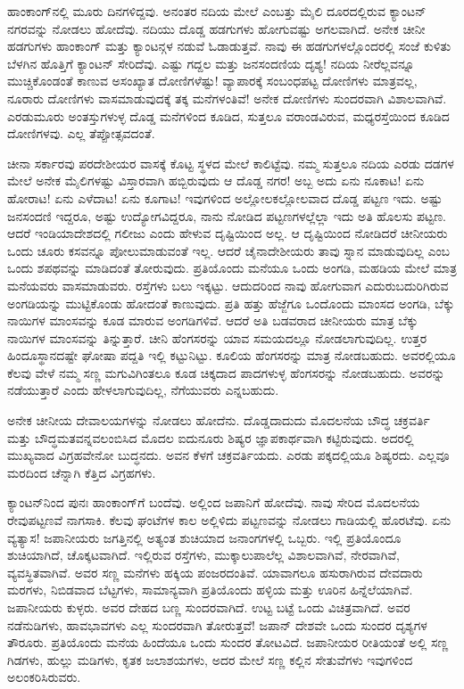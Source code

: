 ಹಾಂಕಾಂಗ್‌ನಲ್ಲಿ ಮೂರು ದಿನಗಳಿದ್ದವು. ಅನಂತರ ನದಿಯ ಮೇಲೆ ಎಂಬತ್ತು ಮೈಲಿ ದೂರದಲ್ಲಿರುವ ಕ್ಯಾಂಟನ್ ನಗರವನ್ನು ನೋಡಲು ಹೋದೆವು. ನದಿಯು ದೊಡ್ಡ ಹಡಗುಗಳು ಹೋಗುವಷ್ಟು ಅಗಲವಾಗಿದೆ. ಅನೇಕ ಚೀನೀ ಹಡಗುಗಳು ಹಾಂಕಾಂಗ್ ಮತ್ತು ಕ್ಯಾಂಟನ್ಗಳ ನಡುವೆ ಓಡಾಡುತ್ತವೆ. ನಾವು ಈ ಹಡಗುಗಳಲ್ಲೊಂದರಲ್ಲಿ ಸಂಜೆ ಕುಳಿತು ಬೆಳಗಿನ ಹೊತ್ತಿಗೆ ಕ್ಯಾಂಟನ್‌ ಸೇರಿದೆವು. ಎಷ್ಟು ಗದ್ದಲ ಮತ್ತು ಜನಸಂದಣಿಯ ದೃಶ್ಯ! ನದಿಯ ನೀರೆಲ್ಲವನ್ನೂ ಮುಚ್ಚಿಕೊಂಡಂತೆ ಕಾಣುವ ಅಸಂಖ್ಯಾತ ದೋಣಿಗಳೆಷ್ಟು! ವ್ಯಾಪಾರಕ್ಕೆ ಸಂಬಂಧಪಟ್ಟ ದೋಣಿಗಳು ಮಾತ್ರವಲ್ಲ, ನೂರಾರು ದೋಣಿಗಳು ವಾಸಮಾಡುವುದಕ್ಕೆ ತಕ್ಕ ಮನೆಗಳಂತಿವೆ! ಅನೇಕ ದೋಣಿಗಳು ಸುಂದರವಾಗಿ ವಿಶಾಲವಾಗಿವೆ. ಎರಡು\enginline{-}ಮೂರು ಅಂತಸ್ತುಗಳುಳ್ಳ ದೊಡ್ಡ ಮನೆಗಳಿಂದ ಕೂಡಿದ, ಸುತ್ತಲೂ ವರಾಂಡವಿರುವ, ಮಧ್ಯರಸ್ತೆಯಿಂದ ಕೂಡಿದ ದೋಣಿಗಳವು. ಎಲ್ಲ ತೆಪ್ಪೋತ್ಸವದಂತೆ.

ಚೀನಾ ಸರ್ಕಾರವು ಪರದೇಶೀಯರ ವಾಸಕ್ಕೆ ಕೊಟ್ಟ ಸ್ಥಳದ ಮೇಲೆ ಕಾಲಿಟ್ಟೆವು. ನಮ್ಮ ಸುತ್ತಲೂ ನದಿಯ ಎರಡು ದಡಗಳ ಮೇಲೆ ಅನೇಕ ಮೈಲಿಗಳಷ್ಟು ವಿಸ್ತಾರವಾಗಿ ಹಬ್ಬಿರುವುದು ಆ ದೊಡ್ಡ ನಗರ! ಅಬ್ಬ ಅದು ಏನು ನೂಕಾಟ! ಏನು ಹೋರಾಟ! ಏನು ಎಳೆದಾಟ! ಏನು ಕೂಗಾಟ! ಇವುಗಳಿಂದ ಅಲ್ಲೋಲಕಲ್ಲೋಲವಾದ ದೊಡ್ಡ ಪಟ್ಟಣ ಇದು. ಅಷ್ಟು ಜನಸಂದಣಿ ಇದ್ದರೂ, ಅಷ್ಟು ಉದ್ಯೋಗವಿದ್ದರೂ, ನಾನು ನೋಡಿದ ಪಟ್ಟಣಗಳಲ್ಲೆಲ್ಲಾ ಇದು ಅತಿ ಹೊಲಸು ಪಟ್ಟಣ. ಆದರೆ ಇಂಡಿಯಾದೇಶದಲ್ಲಿ ಗಲೀಜು ಎಂದು ಹೇಳುವ ದೃಷ್ಟಿಯಿಂದ ಅಲ್ಲ. ಆ ದೃಷ್ಟಿಯಿಂದ ನೋಡಿದರೆ ಚೀನೀಯರು ಒಂದು ಚೂರು ಕಸವನ್ನೂ ಪೋಲುಮಾಡುವಂತೆ ಇಲ್ಲ. ಆದರೆ ಚೈನಾದೇಶೀಯರು ತಾವು ಸ್ನಾನ ಮಾಡುವುದಿಲ್ಲ ಎಂಬ ಒಂದು ಶಪಥವನ್ನು ಮಾಡಿದಂತೆ ತೋರುವುದು. ಪ್ರತಿಯೊಂದು ಮನೆಯೂ ಒಂದು ಅಂಗಡಿ, ಮಹಡಿಯ ಮೇಲೆ ಮಾತ್ರ ಮನೆಯವರು ವಾಸಮಾಡುವರು. ರಸ್ತೆಗಳು ಬಲು ಇಕ್ಕಟ್ಟು. ಆದುದರಿಂದ ನಾವು ಹೋಗುವಾಗ ಎದುರುಬದುರಿಗಿರುವ ಅಂಗಡಿಯನ್ನು ಮುಟ್ಟಿಕೊಂಡು ಹೋದಂತೆ ಕಾಣುವುದು. ಪ್ರತಿ ಹತ್ತು ಹೆಜ್ಜೆಗೂ ಒಂದೊಂದು ಮಾಂಸದ ಅಂಗಡಿ, ಬೆಕ್ಕು ನಾಯಿಗಳ ಮಾಂಸವನ್ನು ಕೂಡ ಮಾರುವ ಅಂಗಡಿಗಳಿವೆ. ಆದರೆ ಅತಿ ಬಡವರಾದ ಚೀನೀಯರು ಮಾತ್ರ ಬೆಕ್ಕು ನಾಯಿಗಳ ಮಾಂಸವನ್ನು ತಿನ್ನುತ್ತಾರೆ. ಚೀನಿ ಹೆಂಗಸರನ್ನು ಯಾವ ಸಮಯದಲ್ಲೂ ನೋಡಲಾಗುವುದಿಲ್ಲ. ಉತ್ತರ ಹಿಂದೂಸ್ಥಾನದಷ್ಟೇ ಘೋಷಾ ಪದ್ದತಿ ಇಲ್ಲಿ ಕಟ್ಟುನಿಟ್ಟು. ಕೂಲಿಯ ಹೆಂಗಸರನ್ನು ಮಾತ್ರ ನೋಡಬಹುದು. ಅವರಲ್ಲಿಯೂ ಕೆಲವು ವೇಳೆ ನಮ್ಮ ಸಣ್ಣ ಮಗುವಿಗಿಂತಲೂ ಕೂಡ ಚಿಕ್ಕದಾದ ಪಾದಗಳುಳ್ಳ ಹೆಂಗಸರನ್ನು ನೋಡಬಹುದು. ಅವರನ್ನು ನಡೆಯುತ್ತಾರೆ ಎಂದು ಹೇಳಲಾಗುವುದಿಲ್ಲ, ನೆಗೆಯುವರು ಎನ್ನಬಹುದು.

ಅನೇಕ ಚೀನೀಯ ದೇವಾಲಯಗಳನ್ನು ನೋಡಲು ಹೋದೆನು. ದೊಡ್ಡದಾದುದು ಮೊದಲನೆಯ ಬೌದ್ಧ ಚಕ್ರವರ್ತಿ ಮತ್ತು ಬೌದ್ಧಮತವನ್ನವಲಂಬಿಸಿದ ಮೊದಲ ಐದುನೂರು ಶಿಷ್ಯರ ಜ್ಞಾಪಕಾರ್ಥವಾಗಿ ಕಟ್ಟಿರುವುದು. ಅದರಲ್ಲಿ ಮುಖ್ಯವಾದ ವಿಗ್ರಹವೇನೋ ಬುದ್ಧನದು. ಅವನ ಕೆಳಗೆ ಚಕ್ರವರ್ತಿಯದು. ಎರಡು ಪಕ್ಕದಲ್ಲಿಯೂ ಶಿಷ್ಯರದು. ಎಲ್ಲವೂ ಮರದಿಂದ ಚೆನ್ನಾಗಿ ಕೆತ್ತಿದ ವಿಗ್ರಹಗಳು.

ಕ್ಯಾಂಟನ್‌ನಿಂದ ಪುನಃ ಹಾಂಕಾಂಗ್‌ಗೆ ಬಂದೆವು. ಅಲ್ಲಿಂದ ಜಪಾನಿಗೆ ಹೋದೆವು. ನಾವು ಸೇರಿದ ಮೊದಲನೆಯ ರೇವುಪಟ್ಟಣವೆ ನಾಗಸಾಕಿ. ಕೆಲವು ಘಂಟೆಗಳ ಕಾಲ ಅಲ್ಲಿಳಿದು ಪಟ್ಟಣವನ್ನು ನೋಡಲು ಗಾಡಿಯಲ್ಲಿ ಹೊರಟೆವು. ಏನು ವ್ಯತ್ಯಾಸ! ಜಪಾನೀಯರು ಜಗತ್ತಿನಲ್ಲಿ ಅತ್ಯಂತ ಶುಚಿಯಾದ ಜನಾಂಗಗಳಲ್ಲಿ ಒಬ್ಬರು. ಇಲ್ಲಿ ಪ್ರತಿಯೊಂದೂ ಶುಚಿಯಾಗಿದೆ, ಚೊಕ್ಕಟವಾಗಿದೆ. ಇಲ್ಲಿರುವ ರಸ್ತೆಗಳು, ಮುಕ್ಕಾಲುಪಾಲೆಲ್ಲ ವಿಶಾಲವಾಗಿವೆ, ನೇರವಾಗಿವೆ, ವ್ಯವಸ್ಥಿತವಾಗಿವೆ. ಅವರ ಸಣ್ಣ ಮನೆಗಳು ಹಕ್ಕಿಯ ಪಂಜರದಂತಿವೆ. ಯಾವಾಗಲೂ ಹಸುರಾಗಿರುವ ದೇವದಾರು ಮರಗಳು, ನಿಬಿಡವಾದ ಬೆಟ್ಟಗಳು, ಸಾಮಾನ್ಯವಾಗಿ ಪ್ರತಿಯೊಂದು ಹಳ್ಳಿಯ ಮತ್ತು ಊರಿನ ಹಿನ್ನೆಲೆಯಾಗಿವೆ. ಜಪಾನೀಯರು ಕುಳ್ಳರು. ಅವರ ದೇಹದ ಬಣ್ಣ ಸುಂದರವಾಗಿದೆ. ಉಟ್ಟ ಬಟ್ಟೆ ಒಂದು ವಿಚಿತ್ರವಾಗಿದೆ. ಅವರ ನಡೆನುಡಿಗಳು, ಹಾವಭಾವಗಳು ಎಲ್ಲ ಸುಂದರವಾಗಿ ತೋರುತ್ತವೆ! ಜಪಾನ್ ದೇಶವೇ ಒಂದು ಸುಂದರ ದೃಶ್ಯಗಳ ತೌರೂರು. ಪ್ರತಿಯೊಂದು ಮನೆಯ ಹಿಂದೆಯೂ ಒಂದು ಸುಂದರ ತೋಟವಿದೆ. ಜಪಾನೀಯರ ರೀತಿಯಂತೆ ಅಲ್ಲಿ ಸಣ್ಣ ಗಿಡಗಳು, ಹುಲ್ಲು ಮಡಿಗಳು, ಕೃತಕ ಜಲಾಶಯಗಳು, ಅದರ ಮೇಲೆ ಸಣ್ಣ ಕಲ್ಲಿನ ಸೇತುವೆಗಳು ಇವುಗಳಿಂದ ಅಲಂಕರಿಸಿರುವರು.

